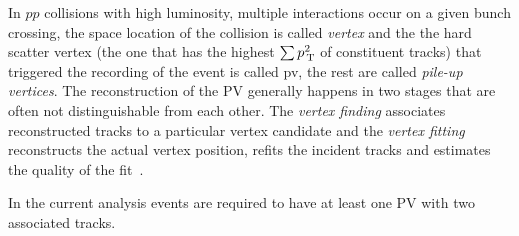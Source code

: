 In $pp$ collisions with high luminosity, multiple interactions occur on a given
bunch crossing, the space location of the collision is called \emph{vertex} and
the the hard scatter vertex (the one that has the highest $\sum p_\mathrm{\, T}^2$ of
constituent tracks) that triggered the recording of the event is called
\gls{pv}, the rest are called \emph{pile-up vertices}. The reconstruction of the
PV generally happens in two stages that are often not distinguishable from each
other. The \emph{vertex finding} associates reconstructed tracks to a particular
vertex candidate and the \emph{vertex fitting} reconstructs the actual vertex
position, refits the incident tracks and estimates the quality of the
fit~\cite{PV}.

In the current analysis events are required to have at least one PV with two
associated tracks.
